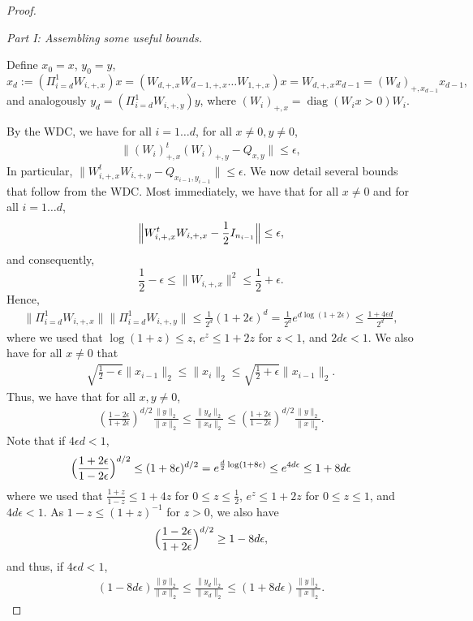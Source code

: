 \documentclass[11pt]{article}
\newcommand{\eps}{\epsilon}
\newcommand{\PiWd}{\Pi_{i=d}^1 W_{i,+,x}}
\newcommand{\PiWdy}{\Pi_{i=d}^1 W_{i,+,y}}
\newcommand{\Wipx}{W_{i, +, x}}
\newcommand{\Wipy}{W_{i, +, y}}
\newcommand{\Wippx}{(W_i)_{+, x}}
\newcommand{\Wippy}{(W_i)_{+, y}}
\newcommand{\Wippxt}{(W_i)^t_{+, x}}
\DeclareMathOperator{\diag}{diag}
\begin{document}
\begin{proof} 
\ 

\textit{Part I: Assembling some useful bounds.}  

Define $x_0 = x$, $y_0=y$, 
\[
x_d := \left( \Pi_{i=d}^1 W_{i,+,x} \right) x = (W_{d,+,x}W_{d-1,+,x}\ldots W_{1,+,x}) x
= W_{d,+,x} x_{d-1} = (W_d)_{+,x_{d-1}} x_{d-1},
\]
and analogously $y_d = \left( \Pi_{i=d}^1 W_{i,+,y} \right) y$, where $\Wippx = \diag(W_i x > 0) W_i$.

By the WDC, we have for all $i = 1 \ldots d$, for all $x\neq 0, y \neq 0$,
\begin{align}
\| \Wippxt \Wippy - Q_{x,y}\| \leq \eps, \label{defn-E1}
\end{align}
  In particular, $\|\Wipx^t \Wipy - Q_{x_{i-1}, y_{i-1}} \| \leq \eps$.   
We now detail several bounds that follow from the WDC.  Most immediately, we have that for all $x \neq 0$ and for all $i = 1 \ldots d$, 
\begin{align}
\Bigl \| \Wipx^t \Wipx - \frac{1}{2} I_{n_{i-1}} \Bigr\| \leq \eps, \label{defn-E1-symmetric-case}
\end{align}
and consequently, 
\[
\frac{1}{2} - \eps \leq \| \Wipx\|^2 \leq \frac{1}{2} + \eps.
\]
Hence,
\begin{align}
\|\PiWd\| \| \PiWdy \|  \leq \frac{1}{2^d} (1 + 2 \eps)^d = \frac{1}{2^d} e^{d \log(1+2 \eps)} \leq \frac{1 + 4 \eps d}{2^d}, \label{bound-piwixiy-on-E1}
\end{align}
where we used that $\log(1+z) \leq z$, $e^z \leq 1 + 2 z$ for $z < 1$, and $2 d \eps < 1$. 
We also have for all $x\neq 0$ that 
\begin{align}
\sqrt{\frac{1}{2} - \eps} \| x_{i-1} \|_2 \leq \| x_i \|_2 \leq \sqrt{\frac{1}{2} + \eps}\|x_{i-1}\|_2.  \label{bound_xi_ximinusone}
\end{align}
Thus, we have that for all $x,y\neq 0$, 
\begin{align*}
\left(\frac{1-2\epsilon}{1+2\epsilon}\right)^{d/2} \frac{\|y\|_2}{\|x\|_2} \leq \frac{\|y_d\|_2}{\|x_d\|_2} \leq \left(\frac{1+2\epsilon}{1-2\epsilon}\right)^{d/2} \frac{\|y\|_2}{\|x\|_2}. 
\end{align*}
Note that if $4 \eps d < 1$, 
\[
\Bigl(\frac{1+2 \eps}{1 - 2 \eps} \Bigr)^{d/2} \leq (1 + 8 \eps)^{d/2} =  e^{\frac{d}{2} \log(1+8\eps)} \leq e^{4 d \eps} \leq 1 + 8 d \eps
\]
where we used that $ \frac{1+z}{1-z} \leq 1+4z$ for $0\leq z\leq \frac{1}{2}$, $e^z \leq 1+2z$ for $0\leq z\leq1$, and $4 d \eps < 1$.  As $1-z \leq (1+z)^{-1}$ for $z>0$, we also have
\[
\Bigl(\frac{1-2 \eps}{1 + 2 \eps} \Bigr)^{d/2} \geq 1 - 8 d \eps,
\]
and thus, if $4 \eps d<1$,
\begin{align}
(1-8 d \eps) \frac{\|y\|_2}{\|x\|_2} \leq \frac{\|y_d\|_2}{\|x_d\|_2} \leq (1+8 d \eps) \frac{\|y\|_2}{\|x\|_2}. \label{bound-yd-over-xd-on-E1}
\end{align}



\end{proof}
\end{document}
